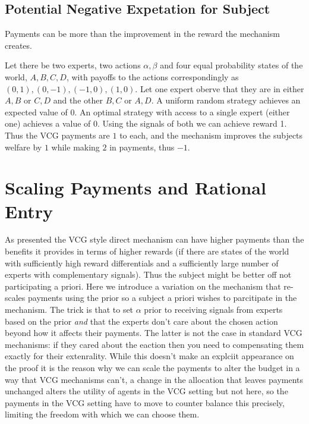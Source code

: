 \subsection{Potential Negative Expetation for Subject}

Payments can be more than the improvement in the reward the mechanism creates.

\begin{eg}
	Let there be two experts, two actions ${\alpha,\beta}$ and four equal probability states of the world, ${A,B,C,D}$, with payoffs to the actions correspondingly as ${(0,1),(0,-1),(-1,0),(1,0)}$. Let one expert oberve that they are in either ${A,B}$ or ${C,D}$ and the other ${B,C}$ or ${A,D}$. A uniform random strategy achieves an expected value of 0. An optimal strategy with access to a single expert (either one) achieves a value of 0. Using the signals of both we can achieve reward 1. Thus the VCG payments are $1$ to each, and the mechanism improves the subjects welfare by $1$ while making $2$ in payments, thus $-1$. 
\end{eg}




\section{Scaling Payments and Rational Entry}

As presented the VCG style direct mechanism can have higher payments than the benefits it provides in terms of higher rewards (if there are states of the world with sufficiently high reward differentials and a sufficiently large number of experts with complementary signals). Thus the subject might be better off not participating a priori. Here we introduce a variation on the mechanism that re-scales payments using the prior so a subject a priori wishes to parcitipate in the mechanism. The trick is that to set $\alpha$ prior to receiving signals from experts based on the prior \emph{and} that the experts don't care about the chosen action beyond how it affects their payments. The latter is not the case in standard VCG mechanisms: if they cared about the eaction then you need to compensating them exactly for their extenrality. While this doesn't make an explciit appearance on the proof it is the reason why we can scale the payments to alter the budget in a way that VCG mechanisms can't, a change in the allocation that leaves payments unchanged alters the utility of agents in the VCG setting but not here, so the payments in the VCG setting have to move to counter balance this precisely, limiting the freedom with which we can choose them.

